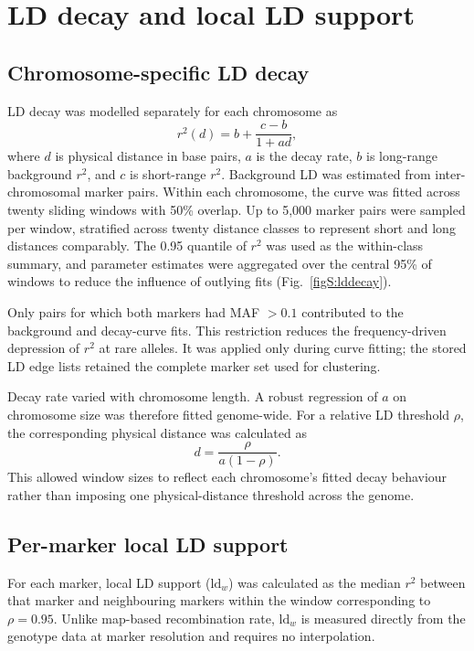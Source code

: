\documentclass[11pt]{article}
\begin{document}
\section{LD decay and local LD support}

\subsection{Chromosome-specific LD decay}

LD decay was modelled separately for each chromosome as
\begin{equation}
  r^2(d) = b + \frac{c-b}{1+a d},
  \label{eq:lddecay}
\end{equation}
where \(d\) is physical distance in base pairs, \(a\) is the decay rate,
\(b\) is long-range background \(r^2\), and \(c\) is short-range \(r^2\).
Background LD was estimated from inter-chromosomal marker pairs. Within each
chromosome, the curve was fitted across twenty sliding windows with 50\%
overlap. Up to 5,000 marker pairs were sampled per window, stratified across
twenty distance classes to represent short and long distances comparably. The
0.95 quantile of \(r^2\) was used as the within-class summary, and parameter
estimates were aggregated over the central 95\% of windows to reduce the
influence of outlying fits (Fig.~\ref{figS:lddecay}).

Only pairs for which both markers had MAF \(>0.1\) contributed to the
background and decay-curve fits. This restriction reduces the frequency-driven
depression of \(r^2\) at rare alleles. It was applied only during curve fitting;
the stored LD edge lists retained the complete marker set used for clustering.

Decay rate varied with chromosome length. A robust regression of \(a\) on
chromosome size was therefore fitted genome-wide. For a relative LD threshold
\(\rho\), the corresponding physical distance was calculated as
\begin{equation}
  d = \frac{\rho}{a(1-\rho)}.
  \label{eq:distance}
\end{equation}
This allowed window sizes to reflect each chromosome's fitted decay behaviour
rather than imposing one physical-distance threshold across the genome.

\subsection{Per-marker local LD support}

For each marker, local LD support (\(\mathrm{ld}_w\)) was calculated as the
median \(r^2\) between that marker and neighbouring markers within the window
corresponding to \(\rho=0.95\). Unlike map-based recombination rate,
\(\mathrm{ld}_w\) is measured directly from the genotype data at marker
resolution and requires no interpolation.
\end{document}
